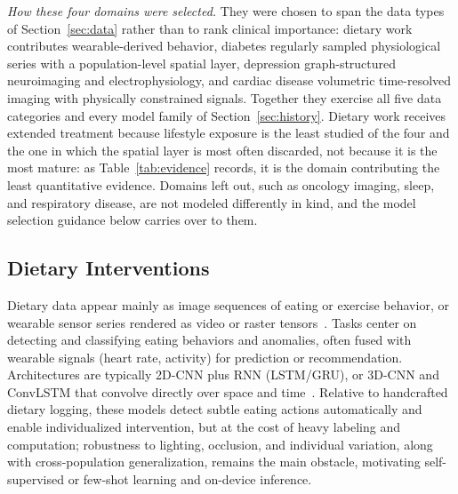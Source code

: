 \documentclass[journal]{IEEEtran}
\begin{document}
\emph{How these four domains were selected.} They were chosen to span the data types of Section~\ref{sec:data} rather than to rank clinical importance: dietary work contributes wearable-derived behavior, diabetes regularly sampled physiological series with a population-level spatial layer, depression graph-structured neuroimaging and electrophysiology, and cardiac disease volumetric time-resolved imaging with physically constrained signals. Together they exercise all five data categories and every model family of Section~\ref{sec:history}. Dietary work receives extended treatment because lifestyle exposure is the least studied of the four and the one in which the spatial layer is most often discarded, not because it is the most mature: as Table~\ref{tab:evidence} records, it is the domain contributing the least quantitative evidence. Domains left out, such as oncology imaging, sleep, and respiratory disease, are not modeled differently in kind, and the model selection guidance below carries over to them.

\subsection{Dietary Interventions}
Dietary data appear mainly as image sequences of eating or exercise behavior, or wearable sensor series rendered as video or raster tensors~\cite{Rouast2020IntakeGesture,Kyritsis2019EatingBehavior}. Tasks center on detecting and classifying eating behaviors and anomalies, often fused with wearable signals (heart rate, activity) for prediction or recommendation. Architectures are typically 2D-CNN plus RNN (LSTM/GRU), or 3D-CNN and ConvLSTM that convolve directly over space and time~\cite{Rouast2020IntakeGesture}. Relative to handcrafted dietary logging, these models detect subtle eating actions automatically and enable individualized intervention, but at the cost of heavy labeling and computation; robustness to lighting, occlusion, and individual variation, along with cross-population generalization, remains the main obstacle, motivating self-supervised or few-shot learning and on-device inference.
\end{document}
